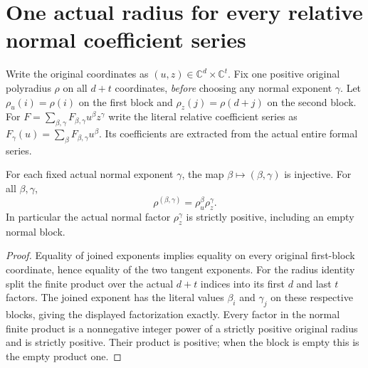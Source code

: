 \section{One actual radius for every relative normal coefficient series}

Write the original coordinates as $(u,z)\in\mathbb C^d\times\mathbb C^t$.
Fix one positive original polyradius $\rho$ on all $d+t$ coordinates,
\emph{before} choosing any normal exponent $\gamma$. Let
$\rho_u(i)=\rho(i)$ on the first block and $\rho_z(j)=\rho(d+j)$ on
the second block. For $F=\sum_{\beta,\gamma}F_{\beta,\gamma}u^\beta z^\gamma$
write the literal relative coefficient series as
$F_\gamma(u)=\sum_\beta F_{\beta,\gamma}u^\beta$.
Its coefficients are extracted from the actual entire formal series.

\begin{lemma}
\label{hir:actual-relative-coefficient-radius-fibre}
\leanok
For each fixed actual normal exponent $\gamma$, the map
$\beta\mapsto(\beta,\gamma)$ is injective. For all $\beta,\gamma$,
\[
 \rho^{(\beta,\gamma)}=\rho_u^\beta\rho_z^\gamma.
\]
In particular the actual normal factor $\rho_z^\gamma$ is strictly
positive, including an empty normal block.
\end{lemma}
\begin{proof}
Equality of joined exponents implies equality on every original first-block
coordinate, hence equality of the two tangent exponents. For the radius
identity split the finite product over the actual $d+t$ indices into its
first $d$ and last $t$ factors. The joined exponent has the literal values
$\beta_i$ and $\gamma_j$ on these respective blocks, giving the displayed
factorization exactly. Every factor in the normal finite product is a
nonnegative integer power of a strictly positive original radius and is
strictly positive. Their product is positive; when the block is empty
this is the empty product one.
\end{proof}

